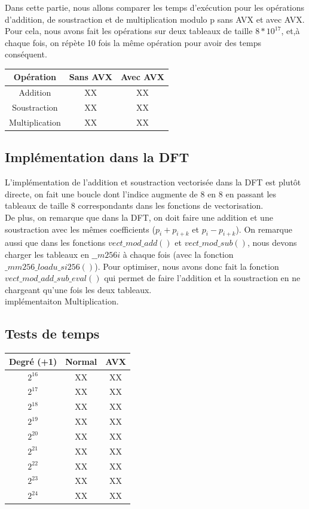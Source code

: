 \documentclass[12pt, a4paper]{article}
\begin{document}
Dans cette partie, nous allons comparer les temps d'exécution pour les opérations d'addition, de soustraction et de multiplication modulo p sans AVX et avec AVX. Pour cela, nous avons fait les opérations sur deux tableaux de taille $8*10^{17}$, et,à chaque fois, on répète 10 fois la même opération pour avoir des temps conséquent.

\begin{center}
\begin{tabular}{||c c c||}
\hline
Opération & Sans AVX & Avec AVX \\
\hline\hline
Addition & XX & XX \\
\hline
Soustraction & XX & XX \\
\hline
Multiplication & XX & XX \\
\hline
\end{tabular}
\end{center}

\subsection{Implémentation dans la DFT}

L'implémentation de l'addition et soustraction vectorisée dans la DFT est plutôt directe, on fait une boucle dont l'indice augmente de 8 en 8 en passant les tableaux de taille 8 correspondants dans les fonctions de vectorisation. \\
De plus, on remarque que dans la DFT, on doit faire une addition et une soustraction avec les mêmes coefficients ($p_i+p_{i+k}$ et $p_i-p_{i+k}$). On remarque aussi que dans les fonctions $vect\_mod\_add()$ et $vect\_mod\_sub()$, nous devons charger les tableaux en $\_\_m256i$ à chaque fois (avec la fonction $\_mm256\_loadu\_si256()$). Pour optimiser, nous avons donc fait la fonction $vect\_mod\_add\_sub\_eval()$ qui permet de faire l'addition et la soustraction en ne chargeant qu'une fois les deux tableaux. \\
implémentaiton Multiplication.

\subsection{Tests de temps}

\begin{center}
\begin{tabular}{||c c c||}
\hline
Degré (+1) & Normal & AVX \\
\hline\hline
$2^{16}$ & XX & XX \\
\hline
$2^{17}$ & XX & XX \\
\hline
$2^{18}$ & XX & XX \\
\hline
$2^{19}$ & XX & XX \\
\hline
$2^{20}$ & XX & XX \\
\hline
$2^{21}$ & XX & XX \\
\hline
$2^{22}$ & XX & XX \\
\hline
$2^{23}$ & XX & XX \\
\hline
$2^{24}$ & XX & XX \\
\hline
\end{tabular}
\end{center}



\end{document}
